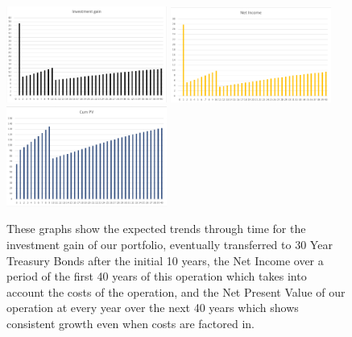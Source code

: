 \documentclass[10pt,twocolumn,twoside,final]{IEEEtran}
\begin{document}
\begin{figure}[!h]\centering
\includegraphics[width=0.47\textwidth]{./figs/60MIG.png}
\includegraphics[width=0.47\textwidth]{./figs/60MNI.png}
\includegraphics[width=0.47\textwidth]{./figs/60MNPV.png}
\caption{These graphs show the expected trends through time for the investment gain of our portfolio, eventually transferred to 30 Year Treasury Bonds after the initial 10 years, the Net Income over a period of the first 40 years of this operation which takes into account the costs of the operation, and the Net Present Value of our operation at every year over the next 40 years which shows consistent growth even when costs are factored in.}
\end{figure}
\end{document}
